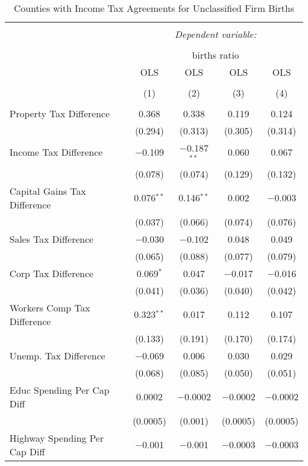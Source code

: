 
\begin{table}[!htbp] \centering 
  \caption{Counties with Income Tax Agreements for  Unclassified Firm Births} 
  \label{99rd} 
\begin{tabular}{@{\extracolsep{5pt}}lcccc} 
\\[-1.8ex]\hline 
\hline \\[-1.8ex] 
 & \multicolumn{4}{c}{\textit{Dependent variable:}} \\ 
\cline{2-5} 
\\[-1.8ex] & \multicolumn{4}{c}{births ratio} \\ 
 & OLS & OLS & OLS & OLS \\ 
\\[-1.8ex] & (1) & (2) & (3) & (4)\\ 
\hline \\[-1.8ex] 
 Property Tax Difference & 0.368 & 0.338 & 0.119 & 0.124 \\ 
  & (0.294) & (0.313) & (0.305) & (0.314) \\ 
  Income Tax Difference & $-$0.109 & $-$0.187$^{**}$ & 0.060 & 0.067 \\ 
  & (0.078) & (0.074) & (0.129) & (0.132) \\ 
  Capital Gains Tax Difference & 0.076$^{**}$ & 0.146$^{**}$ & 0.002 & $-$0.003 \\ 
  & (0.037) & (0.066) & (0.074) & (0.076) \\ 
  Sales Tax Difference & $-$0.030 & $-$0.102 & 0.048 & 0.049 \\ 
  & (0.065) & (0.088) & (0.077) & (0.079) \\ 
  Corp Tax Difference & 0.069$^{*}$ & 0.047 & $-$0.017 & $-$0.016 \\ 
  & (0.041) & (0.036) & (0.040) & (0.042) \\ 
  Workers Comp Tax Difference & 0.323$^{**}$ & 0.017 & 0.112 & 0.107 \\ 
  & (0.133) & (0.191) & (0.170) & (0.174) \\ 
  Unemp. Tax Difference & $-$0.069 & 0.006 & 0.030 & 0.029 \\ 
  & (0.068) & (0.085) & (0.050) & (0.051) \\ 
  Educ Spending Per Cap Diff & 0.0002 & $-$0.0002 & $-$0.0002 & $-$0.0002 \\ 
  & (0.0005) & (0.001) & (0.0005) & (0.0005) \\ 
  Highway Spending Per Cap Diff & $-$0.001 & $-$0.001 & $-$0.0003 & $-$0.0003 \\ 

\end{tabular}
\end{table}
